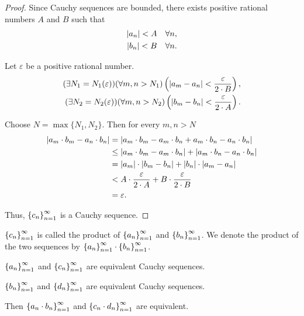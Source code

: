 \begin{proof}
    Since Cauchy sequences are bounded, there exists positive rational numbers $A$ and $B$ such that
    \[
        \begin{split}
            \left\vert{a_{n}}\right\vert < A\quad\forall n, \\
            \left\vert{b_{n}}\right\vert < B\quad\forall n.
        \end{split}
    \]

    Let $\varepsilon$ be a positive rational number.
    \[
        \begin{split}
            (\exists N_{1}=N_{1}(\varepsilon))(\forall m, n > N_{1})\left(\left\vert{a_{m} - a_{n}}\right\vert < \frac{\varepsilon}{2\cdot B}\right), \\
            (\exists N_{2}=N_{2}(\varepsilon))(\forall m, n > N_{2})\left(\left\vert{b_{m} - b_{n}}\right\vert < \frac{\varepsilon}{2\cdot A}\right).
        \end{split}
    \]

    Choose $N = \max\{ N_{1}, N_{2} \}$. Then for every $m, n > N$
    \begin{align*}
        \left\vert{a_{m}\cdot b_{m} - a_{n}\cdot b_{n}}\right\vert & = \left\vert{a_{m}\cdot b_{m} - a_{m}\cdot b_{n} + a_{m}\cdot b_{n} - a_{n}\cdot b_{n}}\right\vert         \\
                                                  & \le \left\vert{a_{m}\cdot b_{m} - a_{m}\cdot b_{n}}\right\vert + \left\vert{a_{m}\cdot b_{n} - a_{n}\cdot b_{n}}\right\vert \\
                                                  & = \left\vert{a_{m}}\right\vert\cdot\left\vert{b_{m} - b_{n}}\right\vert + \left\vert{b_{n}}\right\vert\cdot\left\vert{a_{m} - a_{n}}\right\vert               \\
                                                  & < A\cdot\frac{\varepsilon}{2\cdot A} + B\cdot\frac{\varepsilon}{2\cdot B}                 \\
                                                  & = \varepsilon.
    \end{align*}

    Thus, ${\left\{{c_{n}}\right\}}^{\infty}_{n=1}$ is a Cauchy sequence.
\end{proof}

${\left\{{c_{n}}\right\}}^{\infty}_{n=1}$ is called the product of ${\left\{{a_{n}}\right\}}^{\infty}_{n=1}$ and ${\left\{{b_{n}}\right\}}^{\infty}_{n=1}$. We denote the product of the two sequences by ${\left\{{a_{n}}\right\}}^{\infty}_{n=1}\cdot{\left\{{b_{n}}\right\}}^{\infty}_{n=1}$.

\begin{theorem}
    ${\left\{{a_{n}}\right\}}^{\infty}_{n=1}$ and ${\left\{{c_{n}}\right\}}^{\infty}_{n=1}$ are equivalent Cauchy sequences.

    ${\left\{{b_{n}}\right\}}^{\infty}_{n=1}$ and ${\left\{{d_{n}}\right\}}^{\infty}_{n=1}$ are equivalent Cauchy sequences.

    Then ${\left\{{a_{n} \cdot b_{n}}\right\}}^{\infty}_{n=1}$ and ${\left\{{c_{n} \cdot d_{n}}\right\}}^{\infty}_{n=1}$ are equivalent.
\end{theorem}

